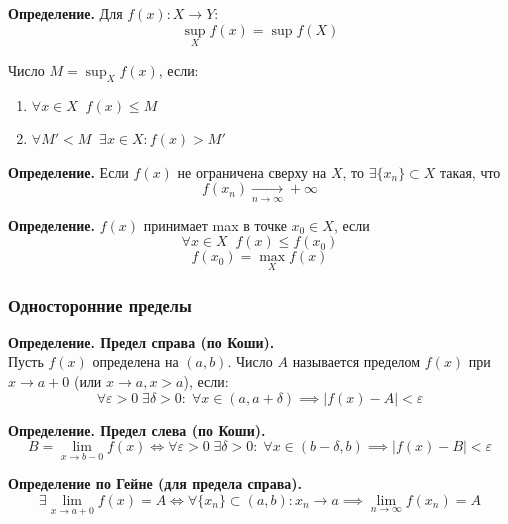 \begin{tcolorbox}
	\textbf{Определение.} Для $f(x): X \to Y$:
	\[ \sup_X f(x) = \sup f(X) \]
\end{tcolorbox}
Число $M = \sup_X f(x)$, если:
\begin{enumerate}
	\item $ \forall x \in X\;\; f(x) \leq M $
	\item $ \forall M' < M\;\; \exists x \in X: f(x) > M' $
\end{enumerate}

\begin{tcolorbox}
	\textbf{Определение.} Если $f(x)$ не ограничена сверху на $X$, то $\exists \{ x_n \} \subset X $ такая, что
	\[ f(x_n) \xrightarrow[n\to\infty]{} +\infty \]
\end{tcolorbox}

\begin{tcolorbox}
	\textbf{Определение.} $f(x)$ принимает max в точке $x_0 \in X$, если
	\[ \forall x \in X\;\; f(x) \leq f(x_0) \]
	\[ f(x_0) = \max_X f(x) \]
\end{tcolorbox}

\subsubsection*{Односторонние пределы}

\begin{tcolorbox}
	\textbf{Определение. Предел справа (по Коши).} \\
	Пусть $f(x)$ определена на $(a, b)$.
	Число $A$ называется пределом $f(x)$ при $x \to a + 0$ (или $x \to a, x > a$), если:
	\[ \forall \varepsilon > 0\; \exists \delta > 0:\; \forall x \in (a, a+ \delta) \implies |f(x) - A| < \varepsilon \]
\end{tcolorbox}

\begin{tcolorbox}
	\textbf{Определение. Предел слева (по Коши).}
	\[ B = \lim_{x \to b-0} f(x) \Leftrightarrow \forall \varepsilon > 0\; \exists \delta > 0:\; \forall x \in (b - \delta, b) \implies |f(x) - B| < \varepsilon \]
\end{tcolorbox}

\begin{tcolorbox}
	\textbf{Определение по Гейне (для предела справа).} 
	\[ \exists \lim_{x \to a + 0} f(x) = A \Leftrightarrow \forall \{x_n\} \subset (a, b): x_n \to a \implies \lim_{n \to \infty} f(x_n) = A \]
\end{tcolorbox}

